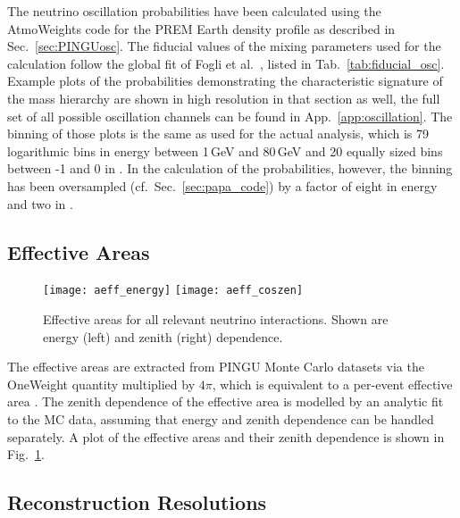 The neutrino oscillation probabilities have been calculated using the
AtmoWeights code for the PREM Earth density profile as described in
Sec.~\ref{sec:PINGUosc}. The fiducial values of the mixing parameters used for
the calculation follow the global fit of Fogli et al.\ \cite{Fogli}, listed in
Tab.~\ref{tab:fiducial_osc}. Example plots of the probabilities demonstrating
the characteristic signature of the mass hierarchy are shown in high resolution
in that section as well, the full set of all possible oscillation channels can
be found in App.~\ref{app:oscillation}. The binning of those plots is the same
as used for the actual analysis, which is 79 logarithmic bins in energy between
1\,GeV and 80\,GeV and 20 equally sized bins between -1 and 0 in \coszen. In
the calculation of the probabilities, however, the binning has been oversampled
(cf.\ Sec.~\ref{sec:papa_code}) by a factor of eight in energy and two in
\coszen.

\subsection{Effective Areas}
\label{sec:input_aeff}

\begin{figure}[htbp]
 \centering
 \texttt{[image: aeff\_energy]}
 \texttt{[image: aeff\_coszen]}
 \caption{Effective areas for all relevant neutrino interactions. Shown are
  energy (left)  and zenith (right) dependence.}
\label{fig:aeffs}
\end{figure}

\noindent
The effective areas are extracted from PINGU Monte Carlo datasets via the
OneWeight quantity multiplied by $4\pi$, which is equivalent to a per-event
effective area \cite{OneWeight}. The zenith dependence of the effective area is
modelled by an analytic fit to the MC data, assuming that energy and zenith
dependence can be handled separately. A plot of the effective areas and their
zenith dependence is shown in Fig.~\ref{fig:aeffs}.

\subsection{Reconstruction Resolutions}
\label{sec:input_reco}

